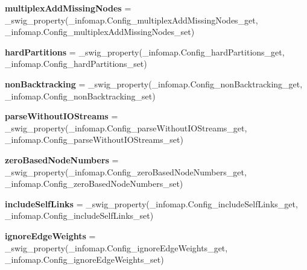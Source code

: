 \begin{DoxyCompactItemize}
\item 
\mbox{\label{classinfomap_1_1Config_a47a82298906ed2cf4265ee036fc41deb}} 
{\bfseries multiplex\+Add\+Missing\+Nodes} = \+\_\+swig\+\_\+property(\+\_\+infomap.\+Config\+\_\+multiplex\+Add\+Missing\+Nodes\+\_\+get, \+\_\+infomap.\+Config\+\_\+multiplex\+Add\+Missing\+Nodes\+\_\+set)
\item 
\mbox{\label{classinfomap_1_1Config_a62a3f157a19d984eec2a07c73f1ec905}} 
{\bfseries hard\+Partitions} = \+\_\+swig\+\_\+property(\+\_\+infomap.\+Config\+\_\+hard\+Partitions\+\_\+get, \+\_\+infomap.\+Config\+\_\+hard\+Partitions\+\_\+set)
\item 
\mbox{\label{classinfomap_1_1Config_a4b4410af3a68e35f4a8d1eba3a5174bb}} 
{\bfseries non\+Backtracking} = \+\_\+swig\+\_\+property(\+\_\+infomap.\+Config\+\_\+non\+Backtracking\+\_\+get, \+\_\+infomap.\+Config\+\_\+non\+Backtracking\+\_\+set)
\item 
\mbox{\label{classinfomap_1_1Config_a8e56998b7604becd8f0b22e830c09a76}} 
{\bfseries parse\+Without\+I\+O\+Streams} = \+\_\+swig\+\_\+property(\+\_\+infomap.\+Config\+\_\+parse\+Without\+I\+O\+Streams\+\_\+get, \+\_\+infomap.\+Config\+\_\+parse\+Without\+I\+O\+Streams\+\_\+set)
\item 
\mbox{\label{classinfomap_1_1Config_acd0f119af7fdbc623374b10f2e85874b}} 
{\bfseries zero\+Based\+Node\+Numbers} = \+\_\+swig\+\_\+property(\+\_\+infomap.\+Config\+\_\+zero\+Based\+Node\+Numbers\+\_\+get, \+\_\+infomap.\+Config\+\_\+zero\+Based\+Node\+Numbers\+\_\+set)
\item 
\mbox{\label{classinfomap_1_1Config_ae27cc857e72fd315b63d5f816f8c9cb7}} 
{\bfseries include\+Self\+Links} = \+\_\+swig\+\_\+property(\+\_\+infomap.\+Config\+\_\+include\+Self\+Links\+\_\+get, \+\_\+infomap.\+Config\+\_\+include\+Self\+Links\+\_\+set)
\item 
\mbox{\label{classinfomap_1_1Config_a6c5ab8537ceb5daa5997ddca397efa65}} 
{\bfseries ignore\+Edge\+Weights} = \+\_\+swig\+\_\+property(\+\_\+infomap.\+Config\+\_\+ignore\+Edge\+Weights\+\_\+get, \+\_\+infomap.\+Config\+\_\+ignore\+Edge\+Weights\+\_\+set)

\end{DoxyCompactItemize}
